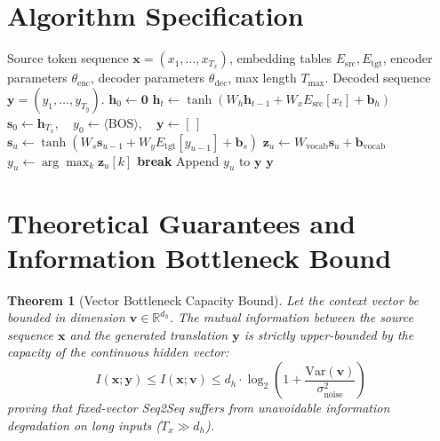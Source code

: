 \documentclass[11pt,a4paper]{article}
\newtheorem{theorem}{Theorem}
\theoremstyle{definition}
\begin{document}
\section{Algorithm Specification}

\begin{algorithm}[H]
\caption{Seq2Seq Greedy Autoregressive Generation}
\label{alg:seq2seq}
\begin{algorithmic}[1]
\Require Source token sequence $\mathbf{x} = (x_1, \dots, x_{T_x})$, embedding tables $E_{\text{src}}, E_{\text{tgt}}$, encoder parameters $\theta_{\text{enc}}$, decoder parameters $\theta_{\text{dec}}$, max length $T_{\max}$.
\Ensure Decoded sequence $\mathbf{y} = (y_1, \dots, y_{T_y})$.
\State $\mathbf{h}_0 \gets \mathbf{0}$
 
    \State $\mathbf{h}_t \gets \tanh(W_h \mathbf{h}_{t-1} + W_x E_{\text{src}}[x_t] + \mathbf{b}_h)$
\EndFor
\State $\mathbf{s}_0 \gets \mathbf{h}_{T_x}, \quad y_0 \gets \langle \text{BOS} \rangle, \quad \mathbf{y} \gets [\,]$
 
    \State $\mathbf{s}_u \gets \tanh(W_s \mathbf{s}_{u-1} + W_y E_{\text{tgt}}[y_{u-1}] + \mathbf{b}_s)$
    \State $\mathbf{z}_u \gets W_{\text{vocab}} \mathbf{s}_u + \mathbf{b}_{\text{vocab}}$
    \State $y_u \gets \arg\max_{k} \mathbf{z}_u[k]$
        \State \textbf{break}
    \EndIf
    \State Append $y_u$ to $\mathbf{y}$
\EndFor
\State \Return $\mathbf{y}$
\end{algorithmic}
\end{algorithm}

\section{Theoretical Guarantees and Information Bottleneck Bound}

\begin{theorem}[Vector Bottleneck Capacity Bound]
\label{thm:bottleneck}
Let the context vector be bounded in dimension $\mathbf{v} \in \mathbb{R}^{d_h}$. The mutual information between the source sequence $\mathbf{x}$ and the generated translation $\mathbf{y}$ is strictly upper-bounded by the capacity of the continuous hidden vector:
\begin{equation}
I(\mathbf{x}; \mathbf{y}) \le I(\mathbf{x}; \mathbf{v}) \le d_h \cdot \log_2\left(1 + \frac{\text{Var}(\mathbf{v})}{\sigma_{\text{noise}}^2}\right)
\end{equation}
proving that fixed-vector Seq2Seq suffers from unavoidable information degradation on long inputs ($T_x \gg d_h$).
\end{theorem}
\end{document}
